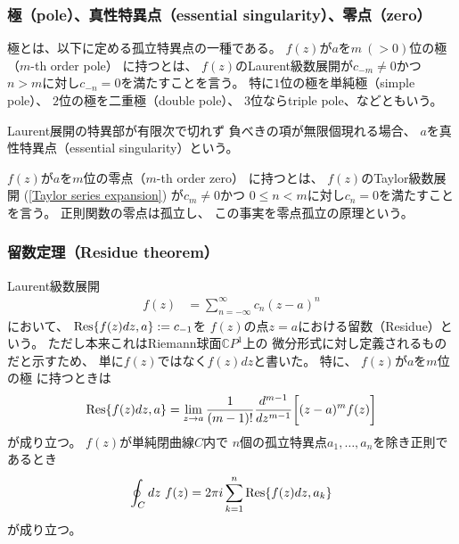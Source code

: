 \subsubsection{極（pole）、真性特異点（essential singularity）、零点（zero）}

極とは、以下に定める孤立特異点の一種である。
$f(z)$が$a$を$m\ (>0)$位の極（$m$-th order pole）
に持つとは、
$f(z)$のLaurent級数展開が$c_{-m} \neq 0$かつ
$n>m$に対し$c_{-n}=0$を満たすことを言う。
特に$1$位の極を単純極（simple pole）、
$2$位の極を二重極（double pole）、
$3$位ならtriple pole、などともいう。

Laurent展開の特異部が有限次で切れず
負べきの項が無限個現れる場合、
$a$を真性特異点（essential singularity）という。

$f(z)$が$a$を$m$位の零点（$m$-th order zero）
に持つとは、
$f(z)$のTaylor級数展開
(\ref{Taylor series expansion})
が$c_{m} \neq 0$かつ
$0 \le n < m$に対し$c_{n}=0$を満たすことを言う。
正則関数の零点は孤立し、
この事実を零点孤立の原理という。

\subsubsection{留数定理（Residue theorem）}

Laurent級数展開
\begin{align}
    f(z)
    &= \sum_{n=-\infty}^{\infty}
        c_n (z-a)^n
\end{align}
において、
$\Res{f(z)dz, a} := c_{-1}$を
$f(z)$の点$z=a$における留数（Residue）という。
ただし本来これはRiemann球面$\mathbb{C}P^1$上の
微分形式に対し定義されるものだと示すため、
単に$f(z)$ではなく$f(z)dz$と書いた。
特に、
$f(z)$が$a$を$m$位の極
に持つときは
\begin{align}
    \Res{f(z)dz, a}
    =
    \lim_{z \to a}
    \dfrac{1}{(m-1)!}
    \dfrac{d^{m-1}}{dz^{m-1}}
    \bigg[
        (z-a)^m f(z)
    \bigg]
\end{align}
が成り立つ。
$f(z)$が単純閉曲線$C$内で
$n$個の孤立特異点$a_1,\dots,a_n$を除き正則であるとき
\begin{align}
    \oint_C dz\ f(z)
    =
    2 \pi i \sum_{k=1}^n
    \Res{f(z)dz, a_k}
\end{align}
が成り立つ。


